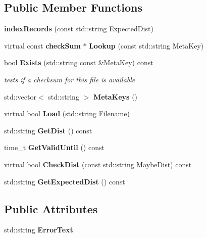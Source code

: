 \subsection*{\-Public \-Member \-Functions}
\begin{DoxyCompactItemize}
\item 
{\bfseries index\-Records} (const std\-::string \-Expected\-Dist)\label{classindexRecords_a2a54bd287d5c6f9615f59318f390b5cd}

\item 
virtual const {\bf check\-Sum} $\ast$ {\bfseries \-Lookup} (const std\-::string \-Meta\-Key)\label{classindexRecords_a76da07fe7a37cb6f4a6b0a04b2d59308}

\item 
bool {\bf \-Exists} (std\-::string const \&\-Meta\-Key) const \label{classindexRecords_a0fe19e3ada59252ff7768805a63bc01b}

\begin{DoxyCompactList}\small\item\em tests if a checksum for this file is available \end{DoxyCompactList}\item 
std\-::vector$<$ std\-::string $>$ {\bfseries \-Meta\-Keys} ()\label{classindexRecords_a7757688e441f23c4f6112a088a98dce6}

\item 
virtual bool {\bfseries \-Load} (std\-::string \-Filename)\label{classindexRecords_a65965e86389d4e2a0d31c65b3c822cad}

\item 
std\-::string {\bfseries \-Get\-Dist} () const \label{classindexRecords_ad7f1e2efc1ba821ab21deba001976172}

\item 
time\-\_\-t {\bfseries \-Get\-Valid\-Until} () const \label{classindexRecords_a58d2f0ab255c3d73a988318693a168ba}

\item 
virtual bool {\bfseries \-Check\-Dist} (const std\-::string \-Maybe\-Dist) const \label{classindexRecords_afbda102eb169bed9d4c86e5f20f3641a}

\item 
std\-::string {\bfseries \-Get\-Expected\-Dist} () const \label{classindexRecords_ad54a11f71c42e4fd15402b9800b82926}

\end{DoxyCompactItemize}
\subsection*{\-Public \-Attributes}
\begin{DoxyCompactItemize}
\item 
std\-::string {\bfseries \-Error\-Text}\label{classindexRecords_ab2638de684977037618d65aa009384b1}

\end{DoxyCompactItemize}
